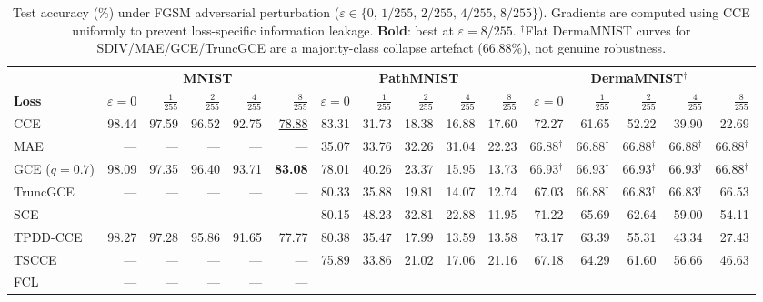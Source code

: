 \begin{table}[t]
\centering
\caption{%
Test accuracy (\%) under FGSM adversarial perturbation
($\varepsilon \in \{0,\,1/255,\,2/255,\,4/255,\,8/255\}$).
Gradients are computed using CCE uniformly to prevent loss-specific
information leakage.
\textbf{Bold}: best at $\varepsilon{=}8/255$.
$^\dagger$Flat DermaMNIST curves for SDIV/MAE/GCE/TruncGCE are a
majority-class collapse artefact (66.88\%), not genuine robustness.
}
\label{tab:fgsm}
\small
\setlength{\tabcolsep}{5pt}
\begin{tabular}{@{}l rrrrr | rrrrr | rrrrr@{}}
\toprule
 & \multicolumn{5}{c|}{\textbf{MNIST}} &
   \multicolumn{5}{c|}{\textbf{PathMNIST}} &
   \multicolumn{5}{c}{\textbf{DermaMNIST}$^\dagger$} \\
\cmidrule(lr){2-6}\cmidrule(lr){7-11}\cmidrule(l){12-16}
\textbf{Loss}
  & $\varepsilon{=}0$ & $\tfrac{1}{255}$ & $\tfrac{2}{255}$ & $\tfrac{4}{255}$ & $\tfrac{8}{255}$
  & $\varepsilon{=}0$ & $\tfrac{1}{255}$ & $\tfrac{2}{255}$ & $\tfrac{4}{255}$ & $\tfrac{8}{255}$
  & $\varepsilon{=}0$ & $\tfrac{1}{255}$ & $\tfrac{2}{255}$ & $\tfrac{4}{255}$ & $\tfrac{8}{255}$ \\
\midrule
CCE
  & 98.44 & 97.59 & 96.52 & 92.75 & \underline{78.88}
  & 83.31 & 31.73 & 18.38 & 16.88 & 17.60
  & 72.27 & 61.65 & 52.22 & 39.90 & 22.69 \\
MAE
  & ---   & ---   & ---   & ---   & ---
  & 35.07 & 33.76 & 32.26 & 31.04 & 22.23
  & 66.88$^\dagger$ & 66.88$^\dagger$ & 66.88$^\dagger$ & 66.88$^\dagger$ & 66.88$^\dagger$ \\
GCE ($q{=}0.7$)
  & 98.09 & 97.35 & 96.40 & 93.71 & \textbf{83.08}
  & 78.01 & 40.26 & 23.37 & 15.95 & 13.73
  & 66.93$^\dagger$ & 66.93$^\dagger$ & 66.93$^\dagger$ & 66.93$^\dagger$ & 66.88$^\dagger$ \\
TruncGCE
  & ---   & ---   & ---   & ---   & ---
  & 80.33 & 35.88 & 19.81 & 14.07 & 12.74
  & 67.03 & 66.88$^\dagger$ & 66.83$^\dagger$ & 66.83$^\dagger$ & 66.53 \\
SCE
  & ---   & ---   & ---   & ---   & ---
  & 80.15 & 48.23 & 32.81 & 22.88 & 11.95
  & 71.22 & 65.69 & 62.64 & 59.00 & 54.11 \\
TPDD-CCE
  & 98.27 & 97.28 & 95.86 & 91.65 & 77.77
  & 80.38 & 35.47 & 17.99 & 13.59 & 13.58
  & 73.17 & 63.39 & 55.31 & 43.34 & 27.43 \\
TSCCE
  & ---   & ---   & ---   & ---   & ---
  & 75.89 & 33.86 & 21.02 & 17.06 & 21.16
  & 67.18 & 64.29 & 61.60 & 56.66 & 46.63 \\
FCL
  & ---   & ---   & ---   & ---   & ---

\end{tabular}
\end{table}
